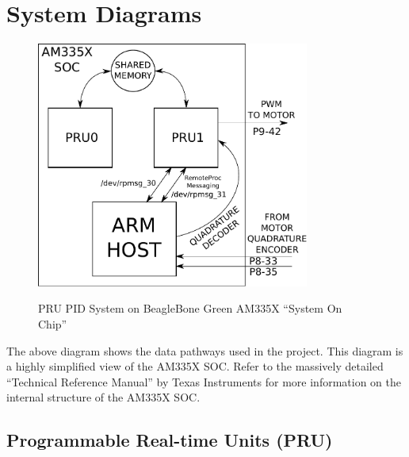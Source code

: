 %
%
%

\chapter{System Diagrams}

\begin{figure}[H]
	\centering
	\includegraphics[width=0.8\textwidth]{diagrams/soc_system}
	\centering\bfseries
	\caption{PRU PID System on BeagleBone Green AM335X ``System On Chip''}
\end{figure}

The above diagram shows the data pathways used in the project.  This diagram is a highly simplified view of the AM335X SOC.  Refer to the massively detailed ``Technical Reference Manual'' by Texas Instruments for more information on the internal structure of the AM335X SOC.

\section{Programmable Real-time Units (PRU)}

